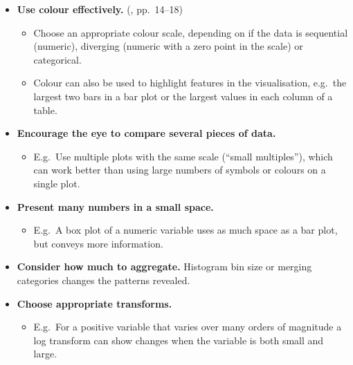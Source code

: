\documentclass[10pt]{article}
\begin{document}
\begin{multicols}{3}
{\begin{itemize}[itemsep=1ex]
  clearer in graphics than tables. However, tables are a form of
  visualisation, and good for conveying raw data or dealing with large
  numbers of variables.
\item \textbf{Use colour effectively.} (\citealp{WexlEtal17big}, pp.~14--18)
  \begin{itemize}
  \item Choose an appropriate colour scale, depending on if the data
    is sequential (numeric), diverging (numeric with a zero point in
    the scale) or categorical.
  \item Colour can also be used to highlight features in the visualisation,
    e.g.~the largest two bars in a bar plot or the largest values in
    each column of a table.
  \end{itemize}
\item \textbf{Encourage the eye to compare several pieces of data.}
  \begin{itemize}
  \item E.g.~Use multiple plots with the same scale (``small
    multiples''), which can work better than using large numbers of
    symbols or colours on a single plot.
  \end{itemize}
\item \textbf{Present many numbers in a small space.}
  \begin{itemize}
  \item E.g.~A box plot of a numeric variable uses as much space as a
    bar plot, but conveys more information.
  \end{itemize}
\item \textbf{Consider how much to aggregate.} Histogram bin size or
  merging categories changes the patterns revealed.
\item \textbf{Choose appropriate transforms.}
  \begin{itemize}
  \item E.g.~For a positive variable that varies over many orders of
    magnitude %
    a log transform can show changes when the variable is both small
    and large.
  \end{itemize}
\end{itemize}
}


\end{multicols}
\end{document}
